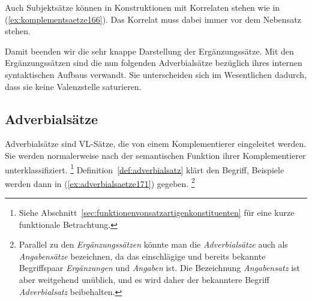\begin{exe}
  \ex\label{ex:komplementsaetze162}
  \begin{xlist}
  \end{xlist}
\end{exe}


Auch Subjektsätze können in Konstruktionen mit Korrelaten stehen wie in (\ref{ex:komplementsaetze166}).
Das Korrelat muss dabei immer vor dem Nebensatz stehen.

\begin{exe}
  \ex\label{ex:komplementsaetze166}
  \begin{xlist}
  \end{xlist}
\end{exe}

Damit beenden wir die sehr knappe Darstellung der Ergänzungssätze.
Mit den Ergänzungssätzen sind die nun folgenden Adverbialsätze bezüglich ihres internen syntaktischen Aufbaus verwandt.
Sie unterscheiden sich im Wesentlichen dadurch, dass sie keine Valenzstelle saturieren.


\subsection{Adverbialsätze}
\label{sec:adverbialsaetze}


Adverbialsätze sind VL-Sätze, die von einem Komplementierer eingeleitet werden.
Sie werden normalerweise nach der semantischen Funktion ihrer Komplementierer unterklassifiziert.%
\footnote{Siehe Abschnitt~\ref{sec:funktionenvonsatzartigenkonstituenten} für eine kurze funktionale Betrachtung.}
Definition~\ref{def:adverbialsatz} klärt den Begriff, Beispiele werden dann in (\ref{ex:adverbialsaetze171}) gegeben.%
\footnote{Parallel zu den \textit{Ergänzungssätzen} könnte man die \textit{Adverbialsätze} auch als \textit{Angabensätze} bezeichnen, da das einschlägige und bereits bekannte Begriffspaar \textit{Ergänzungen} und \textit{Angaben} ist.
Die Bezeichnung \textit{Angabensatz} ist aber weitgehend unüblich, und es wird daher der bekanntere Begriff \textit{Adverbialsatz} beibehalten.}

